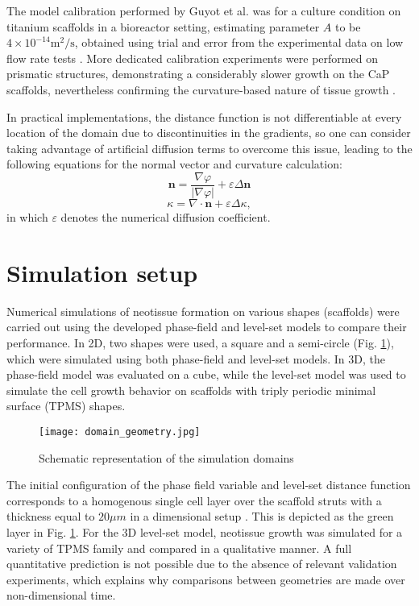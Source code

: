 The model calibration performed by Guyot et al. \cite{Guyot2014} was for a culture condition on titanium scaffolds in a bioreactor setting, estimating parameter $A$ to be $4\times10^{-14} \text{m}^2/\text{s}$, obtained using trial and error from the experimental data on low flow rate tests \cite{Papantoniou2014}.
More dedicated calibration experiments were performed on prismatic structures, demonstrating a considerably slower growth on the CaP scaffolds, nevertheless confirming the curvature-based nature of tissue growth \cite{Hede2021}.

In practical implementations, the distance function is not differentiable at every location of the domain due to discontinuities in the gradients, so one can consider taking advantage of artificial diffusion terms to overcome this issue, leading to the following equations for the normal vector and curvature calculation:
\begin{equation}
\boldsymbol{n}=\frac{\nabla \varphi}{|\nabla \varphi|}+\varepsilon \Delta \boldsymbol{n}
\end{equation}
\begin{equation}
\kappa=\nabla \cdot \boldsymbol{n}+\varepsilon \Delta \kappa,
\end{equation}
in which $\varepsilon$ denotes the numerical diffusion coefficient.


\section{Simulation setup}

Numerical simulations of neotissue formation on various shapes (scaffolds) were carried out using the developed phase-field and level-set models to compare their performance. In 2D, two shapes were used, a square and a semi-circle (Fig. \ref{fig:tissue_domain_geometry}), which were simulated using both phase-field and level-set models. In 3D, the phase-field model was evaluated on a cube, while the level-set model was used to simulate the cell growth behavior on scaffolds with triply periodic minimal surface (TPMS) shapes. 

\begin{figure}
\medskip
\centering
\texttt{[image: domain\_geometry.jpg]}
\caption[Schematic representation of the simulation domains]{Schematic representation of the simulation domains}
\label{fig:tissue_domain_geometry}
\end{figure}

The initial configuration of the phase field variable and level-set distance function corresponds to a homogenous single cell layer over the scaffold struts with a thickness equal to $20 \mu m$ in a dimensional setup \cite{Darling2008}. This is depicted as the green layer in Fig. \ref{fig:tissue_domain_geometry}. For the 3D level-set model, neotissue growth was simulated for a variety of TPMS family and compared in a qualitative manner. A full quantitative prediction is not possible due to the absence of relevant validation experiments, which explains why comparisons between geometries are made over non-dimensional time. 

